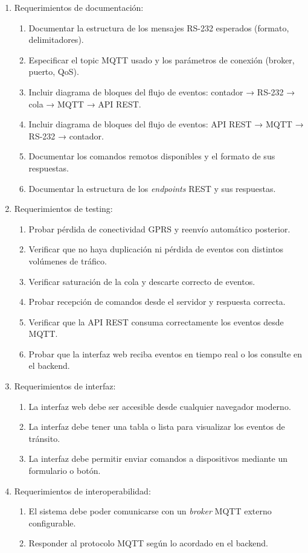 \documentclass[
11pt, %
]{charter}
\begin{document}
\begin{enumerate}
	\item Requerimientos de documentación:
		\begin{enumerate}
			\item Documentar la estructura de los mensajes RS-232 esperados (formato, delimitadores).
			\item Especificar el topic MQTT usado y los parámetros de conexión (broker, puerto, QoS).
			\item Incluir diagrama de bloques del flujo de eventos: contador → RS-232 → cola → MQTT → API REST.
			\item Incluir diagrama de bloques del flujo de eventos: API REST → MQTT → RS-232 → contador.
			\item  Documentar los comandos remotos disponibles y el formato de sus respuestas.
			\item Documentar la estructura de los \textit{endpoints} REST y sus respuestas.
		\end{enumerate}

	\item Requerimientos de testing:
		\begin{enumerate}
			\item Probar pérdida de conectividad GPRS y reenvío automático posterior.
			\item Verificar que no haya duplicación ni pérdida de eventos con distintos volúmenes de tráfico.
			\item  Verificar saturación de la cola y descarte correcto de eventos.
			\item  Probar recepción de comandos desde el servidor y respuesta correcta.
			\item  Verificar que la API REST consuma correctamente los eventos desde MQTT.
			\item  Probar que la interfaz web reciba eventos en tiempo real o los consulte en el backend.
		\end{enumerate}
	\item Requerimientos de interfaz:
		\begin{enumerate}
			\item La interfaz web debe ser accesible desde cualquier navegador moderno.
			\item La interfaz debe tener una tabla o lista para visualizar los eventos de tránsito.
			\item La interfaz debe permitir enviar comandos a dispositivos mediante un formulario o botón.
		\end{enumerate}

	
	\item Requerimientos de interoperabilidad:
		\begin{enumerate}
			\item  El sistema debe poder comunicarse con un \textit{broker} MQTT externo configurable.
			\item Responder al protocolo MQTT según lo acordado en el backend.
		\end{enumerate}


\end{enumerate}
\end{document}
